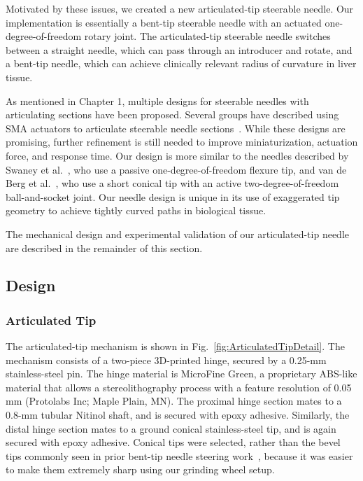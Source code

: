 Motivated by these issues, we created a new articulated-tip steerable needle. Our implementation is essentially a bent-tip steerable needle with an actuated one-degree-of-freedom rotary joint. The articulated-tip steerable needle switches between a straight needle, which can pass through an introducer and rotate, and a bent-tip needle, which can achieve clinically relevant radius of curvature in liver tissue.

As mentioned in Chapter 1, multiple designs for steerable needles with articulating sections have been proposed. Several groups have described using SMA actuators to articulate steerable needle sections~\cite{Ayvali2012,Datla2014,Ryu2014}. While these designs are promising, further refinement is still needed to improve miniaturization, actuation force, and response time. Our design is more similar to the needles described by Swaney et al.~\cite{Swaney2013}, who use a passive one-degree-of-freedom flexure tip, and van de Berg et al.~\cite{vandeBerg2015}, who use a short conical tip with an active two-degree-of-freedom ball-and-socket joint. Our needle design is unique in its use of exaggerated tip geometry to achieve tightly curved paths in biological tissue.

The mechanical design and experimental validation of our articulated-tip needle are described in the remainder of this section.

\subsection{Design}
\subsubsection{Articulated Tip}
The articulated-tip mechanism is shown in Fig.~\ref{fig:ArticulatedTipDetail}. The mechanism consists of a two-piece 3D-printed hinge, secured by a 0.25-mm stainless-steel pin. The hinge material is MicroFine Green, a proprietary ABS-like material that allows a stereolithography process with a feature resolution of 0.05 mm (Protolabs Inc; Maple Plain, MN). The proximal hinge section mates to a 0.8-mm tubular Nitinol shaft, and is secured with epoxy adhesive. Similarly, the distal hinge section mates to a ground conical stainless-steel tip, and is again secured with epoxy adhesive. Conical tips were selected, rather than the bevel tips commonly seen in prior bent-tip needle steering work~\cite{Majewicz2010,Majewicz2012}, because it was easier to make them extremely sharp using our grinding wheel setup. 

